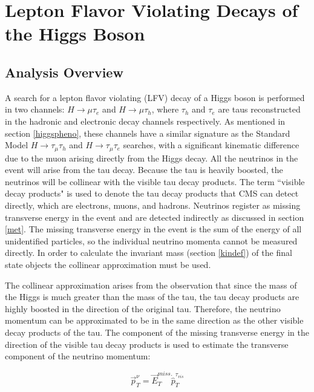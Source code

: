 \documentclass[oneside, letterpaper, oldfontcommands]{memoir}
\begin{document}
\chapter{Lepton Flavor Violating Decays of the Higgs Boson}\label{lfv}

\section{Analysis Overview}\label{lfvoverview}
\qquad A search for a lepton flavor violating (LFV) decay of a Higgs boson is performed in two channels: $H \rightarrow \mu\tau_{e}$ and $H \rightarrow \mu\tau_{h}$, where $\tau_{h}$ and $\tau_{e}$ are taus reconstructed in the hadronic and electronic decay channels respectively. As mentioned in section \ref{higgspheno}, these channels have a similar signature as the Standard Model $H \rightarrow \tau_{\mu} \tau_{h}$ and $H \rightarrow \tau_{\mu}\tau_{e}$ searches, with a significant kinematic difference due to the muon arising directly from the Higgs decay. All the neutrinos in the event will arise from the tau decay. Because the tau is heavily boosted, the neutrinos will be collinear with the visible tau decay products. The term ``visible decay products" is used to denote the tau decay products that CMS can detect directly, which are electrons, muons, and hadrons. Neutrinos register as missing transverse energy in the event and are detected indirectly as discussed in section \ref{met}. The missing transverse energy in the event is the sum of the energy of all unidentified particles, so the individual neutrino momenta cannot be measured directly. In order to calculate the invariant mass (section \ref{kindef}) of the final state objects the collinear approximation must be used.

\qquad The collinear approximation\cite{Ellis:1987xu} arises from the observation that since the mass of the Higgs is much greater than the mass of the tau, the tau decay products are highly boosted in the direction of the original tau. Therefore, the neutrino momentum can be approximated to be in the same direction as the other visible decay products of the tau. The component of the missing transverse energy in the direction of the visible tau decay products is used to estimate the transverse component of the neutrino momentum:

\begin{equation}
\vec{p}_{T}^{\nu} = \vec{E}_{T}^{miss} \dot \hat{p}_{T}^{\tau_{vis}}
\end{equation}
\end{document}
